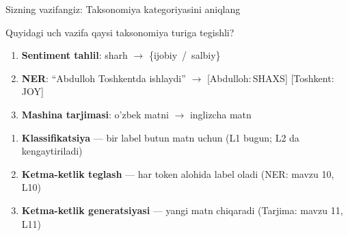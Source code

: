 \documentclass[aspectratio=169,11pt]{beamer}
\begin{document}
\begin{frame}{Sizning vazifangiz: Taksonomiya kategoriyasini aniqlang}
  \begin{tcolorbox}[warnbox,title=Savol --- 90 soniya]
    \small
    Quyidagi uch vazifa qaysi taksonomiya turiga tegishli?\\[5pt]
    \begin{enumerate}\setlength\itemsep{4pt}
      \item \textbf{Sentiment tahlil}:
            sharh $\to$ \{ijobiy \,/\, salbiy\}
      \item \textbf{NER}:
            ``Abdulloh Toshkentda ishlaydi'' $\to$
            [Abdulloh:\,SHAXS] [Toshkent:\,JOY]
      \item \textbf{Mashina tarjimasi}:
            o'zbek matni $\to$ inglizcha matn
    \end{enumerate}
  \end{tcolorbox}
  \pause
  \begin{tcolorbox}[okbox,title=Javob]
    \small
    \begin{enumerate}\setlength\itemsep{3pt}
      \item \textbf{Klassifikatsiya} ---
            bir label butun matn uchun
            (L1 bugun; L2 da kengaytiriladi)
      \item \textbf{Ketma-ketlik teglash} ---
            har token alohida label oladi
            (NER: mavzu \textnumero{}10, L10)
      \item \textbf{Ketma-ketlik generatsiyasi} ---
            yangi matn chiqaradi
            (Tarjima: mavzu \textnumero{}11, L11)
    \end{enumerate}
  \end{tcolorbox}
\end{frame}
\end{document}

